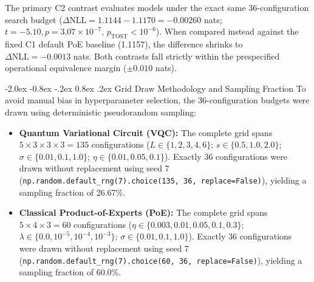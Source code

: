 \documentclass[10pt,a4paper]{article}
\makeatletter
\renewcommand{\subsection}{\@startsection{subsection}{2}{\z@}%
  {-2.0ex \@plus -0.8ex \@minus -.2ex}%
  {0.8ex \@plus.2ex}%
  {\normalfont\large\sffamily\bfseries\color{naturedark}}}
\makeatother
\begin{document}
The primary C2 contrast evaluates models under the exact same 36-configuration search budget ($\Delta\text{NLL} = 1.1144 - 1.1170 = \mathbf{-0.00260}$ nats; $t = -5.10, p = 3.07 \times 10^{-7}$, $p_{\text{TOST}} < 10^{-6}$). When compared instead against the fixed C1 default PoE baseline (1.1157), the difference shrinks to $\Delta\text{NLL} = -0.0013$ nats. Both contrasts fall strictly within the prespecified operational equivalence margin ($\pm 0.010$ nats).

\subsection{Grid Draw Methodology and Sampling Fraction}
To avoid manual bias in hyperparameter selection, the 36-configuration budgets were drawn using deterministic pseudorandom sampling:
\begin{itemize}
  \item \textbf{Quantum Variational Circuit (VQC):} The complete grid spans $5 \times 3 \times 3 \times 3 = 135$ configurations ($L \in \{1, 2, 3, 4, 6\}$; $s \in \{0.5, 1.0, 2.0\}$; $\sigma \in \{0.01, 0.1, 1.0\}$; $\eta \in \{0.01, 0.05, 0.1\}$). Exactly 36 configurations were drawn without replacement using seed 7 (\texttt{np.random.default\_rng(7).choice(135, 36, replace=False)}), yielding a sampling fraction of 26.67\%.
  \item \textbf{Classical Product-of-Experts (PoE):} The complete grid spans $5 \times 4 \times 3 = 60$ configurations ($\eta \in \{0.003, 0.01, 0.05, 0.1, 0.3\}$; $\lambda \in \{0.0, 10^{-5}, 10^{-4}, 10^{-3}\}$; $\sigma \in \{0.01, 0.1, 1.0\}$). Exactly 36 configurations were drawn without replacement using seed 7 (\texttt{np.random.default\_rng(7).choice(60, 36, replace=False)}), yielding a sampling fraction of 60.0\%.
\end{itemize}
\end{document}

